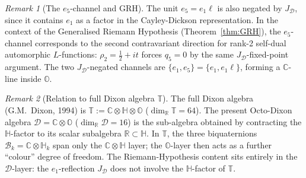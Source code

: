 \documentclass[12pt,a4paper]{article}
\theoremstyle{remark}
\newtheorem*{remark}{Remark}
\begin{document}
\begin{remark}[The $e_5$-channel and GRH]\label{rem:e5_channel}
The unit $e_5=e_1\ell$ is also negated by $J_{\mathcal{D}}$,
since it contains $e_1$ as a factor in the Cayley-Dickson representation.
In the context of the Generalised Riemann Hypothesis
(Theorem~\ref{thm:GRH}), the $e_5$-channel corresponds to the second
contravariant direction for rank-2 self-dual automorphic $L$-functions:
$\rho_2=\tfrac{1}{2}+it$ forces $q_5=0$ by the same
$J_{\mathcal{D}}$-fixed-point argument.
The two $J_{\mathcal{D}}$-negated channels are $\{e_1,e_5\}=\{e_1,e_1\ell\}$,
forming a $\mathbb{C}$-line inside $\mathbb{O}$.
\end{remark}

\begin{remark}[Relation to full Dixon algebra $\mathbb{T}$]
The full Dixon algebra \textup{(}G.M.\ Dixon, 1994\textup{)} is
$\mathbb{T}:=\mathbb{C}\otimes\mathbb{H}\otimes\mathbb{O}$
($\dim_{\mathbb{R}}\mathbb{T}=64$).
The present Octo-Dixon algebra $\mathcal{D}=\mathbb{C}\otimes\mathbb{O}$
($\dim_{\mathbb{R}}\mathcal{D}=16$) is the sub-algebra obtained by
contracting the $\mathbb{H}$-factor to its scalar subalgebra $\mathbb{R}\subset\mathbb{H}$.
In $\mathbb{T}$, the three biquaternions
$\mathcal{B}_k=\mathbb{C}\otimes\mathbb{H}_k$ span only the
$\mathbb{C}\otimes\mathbb{H}$ layer;
the $\mathbb{O}$-layer then acts as a further ``colour'' degree of freedom.
The Riemann-Hypothesis content sits entirely in the $\mathcal{D}$-layer:
the $e_1$-reflection $J_{\mathcal{D}}$ does not involve the
$\mathbb{H}$-factor of $\mathbb{T}$.
\end{remark}


\end{document}
